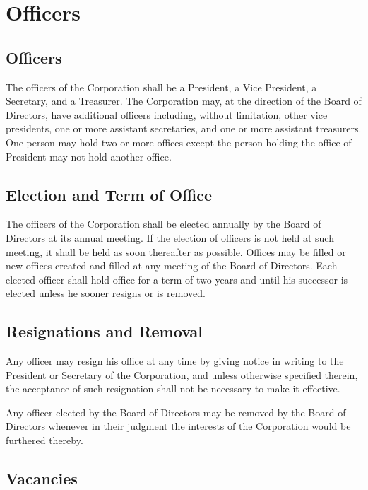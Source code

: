 \chapter{Officers}

\section{Officers}

The officers of the Corporation shall be a President, a Vice President, a
Secretary, and a Treasurer. The Corporation may, at the direction of the Board
of Directors, have additional officers including, without limitation, other
vice presidents, one or more assistant secretaries, and one or more assistant
treasurers. One person may hold two or more offices except the person holding
the office of President may not hold another office.

\section{Election and Term of Office}

The officers of the Corporation shall be elected annually by the Board of
Directors at its annual meeting. If the election of officers is not held at
such meeting, it shall be held as soon thereafter as possible. Offices may be
filled or new offices created and filled at any meeting of the Board of
Directors. Each elected officer shall hold office for a term of two years and
until his successor is elected unless he sooner resigns or is removed.

\section{Resignations and Removal}

Any officer may resign his office at any time by giving notice in writing to
the President or Secretary of the Corporation, and unless otherwise specified
therein, the acceptance of such resignation shall not be necessary to make it
effective.

Any officer elected by the Board of Directors may be removed by the Board of
Directors whenever in their judgment the interests of the Corporation would be
furthered thereby.

\section{Vacancies}

